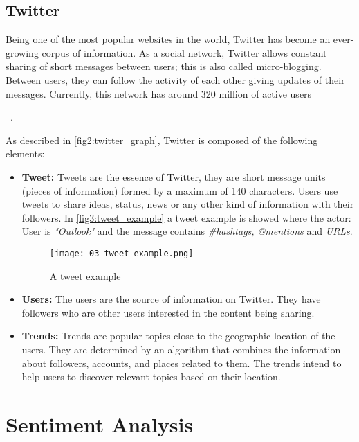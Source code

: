 \subsection{Twitter}
\label{sec:twitter}

Being one of the most popular websites in the world, Twitter has become an ever-growing corpus of information. As a social network, Twitter allows constant sharing of short messages between users; this is also called micro-blogging. Between users, they can follow the activity of each other giving updates of their messages. Currently, this network has around 320 million of active users {~\cite{statTwit2016}.

As described in \autoref{fig2:twitter_graph}, Twitter is composed of the following elements:

\begin{itemize}
\item \textbf{Tweet:} Tweets are the essence of Twitter, they are short message units (pieces of information) formed by a maximum of 140 characters. Users use tweets to share ideas, status, news or any other kind of information with their followers. In \autoref{fig3:tweet_example} a tweet example is showed where the actor: User is \textit{"Outlook"} and the message contains \textit{\#hashtags, @mentions} and \textit{URLs}. 

\pagebreak

\begin{figure}
    \centering
    \caption{A tweet example}
    \texttt{[image: 03\_tweet\_example.png]}
    \label{fig3:tweet_example}
\end{figure} 

\item \textbf{Users:} The users are the source of information on Twitter. They have followers who are other users interested in the content being sharing.
\item \textbf{Trends:} Trends are popular topics close to the geographic location of the users. They are determined by an algorithm that combines the information about followers, accounts, and places related to them. The trends intend to help users to discover relevant topics based on their location.  
\end{itemize}

\section{Sentiment Analysis}
\label{sec:sentAnalysis} 
 
}
